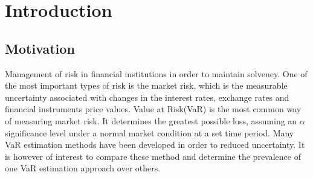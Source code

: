 \documentclass[a4paper,11pt,oneside]{book}
\begin{document}
	
	
	
	\tableofcontents
	



\chapter{Introduction}




\section{Motivation}

Management of risk in financial institutions in order to maintain solvency. One of the most important types of risk is the market risk, which is the measurable uncertainty associated with changes in the interest rates, exchange rates and financial instruments price values.\newline\newline
Value at Risk(VaR) is the most common way of measuring market risk. It determines the greatest possible loss, assuming an $\alpha$ significance level under a normal market condition at a set time period.\newline\newline
Many VaR estimation methods have been developed in order to reduced uncertainty. It is however of interest to compare these method and determine the prevalence of one VaR estimation approach over others.
\end{document}
